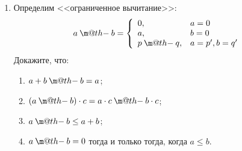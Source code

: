 \documentclass[10pt,a4paper,oneside]{article}
\makeatletter
\newcommand{\dotminus}{\mathbin{\text{\@dotminus}}}
\newcommand{\@dotminus}{%
  \ooalign{\hidewidth\raise1ex\hbox{.}\hidewidth\cr$\m@th-$\cr}%
}
\makeatother
\begin{document}
\begin{enumerate}
\item Определим <<ограниченное вычитание>>: $$a \dotminus b = \left\{\begin{array}{ll}0, & a = 0\\a, & b = 0\\p \dotminus q, & a = p', b = q'\end{array}\right.$$
Докажите, что:
\begin{enumerate}
\item $a + b \dotminus b = a$;
\item $(a \dotminus b) \cdot c = a \cdot c \dotminus b \cdot c$;
\item $a \dotminus b \le a + b$;
\item $a \dotminus b = 0$ тогда и только тогда, когда $a \le b$.
\end{enumerate}

\begin{comment}
\item Обозначим за $\overline{n}$ представление числа $n$ в формальной арифметике: %

$$\overline{n} = \left\{\begin{array}{ll}0, &n = 0\\
           \left(\overline{k}\right)', & n=k+1\end{array}\right.$$

Например, $\overline{5} = 0'''''$. Докажите в формальной арифметике:
\begin{enumerate}
\item $\vdash \overline{2} \cdot \overline{3} = \overline{6}$;
\item $\vdash \forall p.(\exists q.q' = p) \vee p = 0$ (единственность нуля);
\item $\vdash p \cdot q = 0 \rightarrow p = 0 \vee q = 0$ (отсутствие делителей нуля);
\end{enumerate}
\end{comment}
\end{enumerate}
\end{document}

